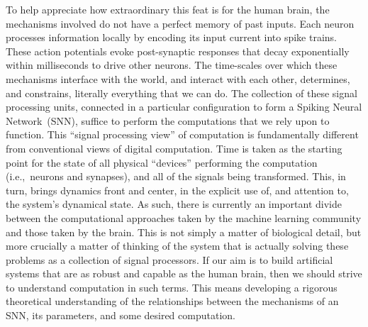 To help appreciate how extraordinary this feat is for the human brain, the mechanisms involved do not have a perfect memory of past inputs.
Each neuron processes information locally by encoding its input current into spike trains.
These action potentials evoke post-synaptic responses that decay exponentially within milliseconds to drive other neurons.
The time-scales over which these mechanisms interface with the world, and interact with each other, determines, and constrains, literally everything that we can do.
The collection of these signal processing units, connected in a particular configuration to form a Spiking Neural Network~(SNN), suffice to perform the computations that we rely upon to function.
This ``signal processing view'' of computation is fundamentally different from conventional views of digital computation.
Time is taken as the starting point for the state of all physical ``devices'' performing the computation (i.e.,~neurons and synapses), and all of the signals being transformed.
This, in turn, brings dynamics front and center, in the explicit use of, and attention to, the system's dynamical state.
As such, there is currently an important divide between the computational approaches taken by the machine learning community and those taken by the brain.
This is not simply a matter of biological detail, but more crucially a matter of thinking of the system that is actually solving these problems as a collection of signal processors.
If our aim is to build artificial systems that are as robust and capable as the human brain, then we should strive to understand computation in such terms.
This means developing a rigorous theoretical understanding of the relationships between the mechanisms of an SNN, its parameters, and some desired computation.


